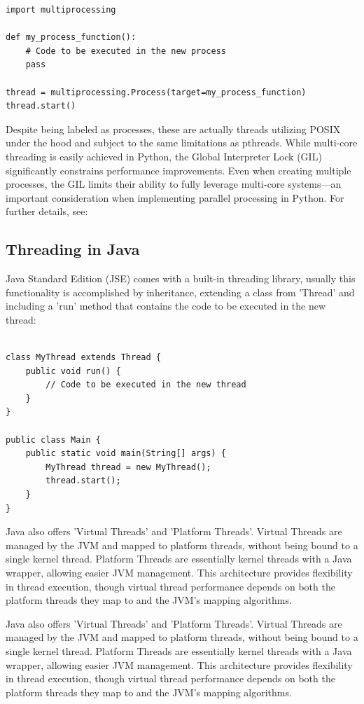\documentclass[12pt,a4paper]{article}
\begin{document}
\begin{verbatim}
import multiprocessing

def my_process_function():
    # Code to be executed in the new process
    pass

thread = multiprocessing.Process(target=my_process_function)
thread.start()
\end{verbatim}

Despite being labeled as processes, these are actually threads utilizing POSIX under the hood\parencite{PythonMultiprocessing} and subject to the same limitations as pthreads. While multi-core threading is easily achieved in Python, the Global Interpreter Lock (GIL) significantly constrains performance improvements\parencite{PythonGIL}. Even when creating multiple processes, the GIL limits their ability to fully leverage multi-core systems—an important consideration when implementing parallel processing in Python. For further details, see: 

\subsection{Threading in Java}

Java Standard Edition (JSE) comes with a built-in threading library\parencite{JavaThreadClass}, usually this functionality is accomplished by inheritance, extending a class from 'Thread' and including a 'run' method that contains the code to be executed in the new thread:

\begin{verbatim}

class MyThread extends Thread {
    public void run() {
        // Code to be executed in the new thread
    }
}

public class Main {
    public static void main(String[] args) {
        MyThread thread = new MyThread();
        thread.start();
    }
}
\end{verbatim}

Java also offers 'Virtual Threads' and 'Platform Threads'\parencite{JavaVirtualThreads}. Virtual Threads are managed by the JVM and mapped to platform threads, without being bound to a single kernel thread. Platform Threads are essentially kernel threads with a Java wrapper, allowing easier JVM management. This architecture provides flexibility in thread execution, though virtual thread performance depends on both the platform threads they map to and the JVM's mapping algorithms.

Java also offers 'Virtual Threads' and 'Platform Threads'\parencite{JavaVirtualThreads}. Virtual Threads are managed by the JVM and mapped to platform threads, without being bound to a single kernel thread. Platform Threads are essentially kernel threads with a Java wrapper, allowing easier JVM management. This architecture provides flexibility in thread execution, though virtual thread performance depends on both the platform threads they map to and the JVM's mapping algorithms.
\end{document}

